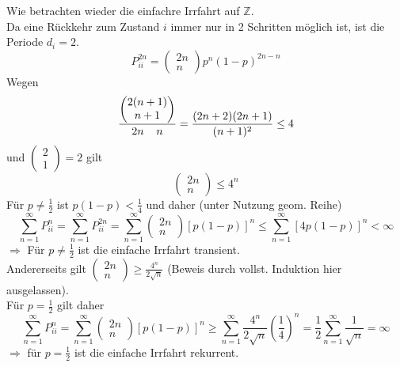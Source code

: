 \documentclass[a4paper,12pt]{article}
\begin{document}
\begin{tcolorbox}[breakable, colframe=blue, colback=white, title=Beispiel 16]
	Wie betrachten wieder die einfachre Irrfahrt auf $\mathbb{Z}$.\\
	Da eine Rückkehr zum Zustand $i$ immer nur in 2 Schritten möglich ist, ist die Periode $d_i = 2$.\\
	$$
		P_{ii}^{2n} = \begin{pmatrix}2n \\ n \end{pmatrix}p^n(1-p)^{2n - n}
	$$
	Wegen
	$$
		\frac{
			\begin{pmatrix} 2(n+1) \\ n+1 \end{pmatrix}
		}{
			2n \\n
		} = \frac{(2n+2)(2n+1)}{(n+1)^2} \leq 4
	$$
	und $\begin{pmatrix}2 \\ 1 \end{pmatrix} = 2$ gilt
	$$
		\begin{pmatrix}2n \\ n \end{pmatrix} \leq 4^n
	$$
	Für $p \neq \frac{1}{2}$ ist $p(1-p)<\frac{1}{4}$ und daher (unter Nutzung geom. Reihe)
	$$
		\sum_{n=1}^{\infty}P_{ii}^n = \sum_{n=1}^{\infty} P_{ii}^{2n} = \sum_{n=1}^{\infty}
		\begin{pmatrix}2n \\ n \end{pmatrix} [p(1-p)]^n
		\leq \sum_{n=1}^{\infty}[4p(1-p)]^n
		< \infty
	$$
	$\Rightarrow$ Für $p \neq \frac{1}{2}$ ist die einfache Irrfahrt transient.\\


	Andererseits gilt $\begin{pmatrix}2n \\ n \end{pmatrix} \geq \frac{4^n}{2 \sqrt{n}}$ (Beweis durch vollst. Induktion hier ausgelassen).\\
	Für $p = \frac{1}{2}$ gilt daher
	$$
		\sum_{n=1}^{	\infty} P_{ii}^n = \sum_{n=1}^{\infty} \begin{pmatrix}2n \\ n \end{pmatrix} [p(1-p)]^n \geq \sum_{n=1}^{\infty}
		\frac{4^n}{2 \sqrt{n}}\left(\frac{1}{4}\right)^n = \frac{1}{2}\sum_{n=1}^{\infty}\frac{1}{\sqrt{n}} = \infty
	$$
	$\Rightarrow$ für $p = \frac{1}{2}$ ist die einfache Irrfahrt rekurrent.
\end{tcolorbox}
\end{document}
